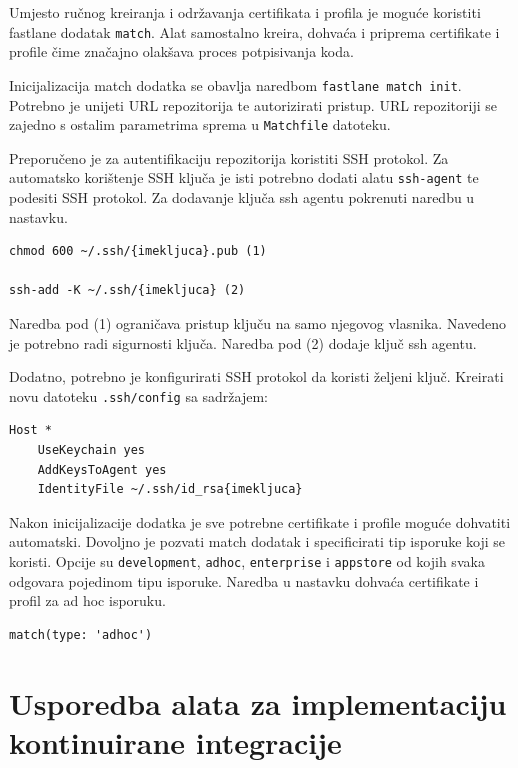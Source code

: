 \documentclass[times, utf8, diplomski, numeric]{fer}
\begin{document}
\begin{appendices}
Umjesto ručnog kreiranja i održavanja certifikata i profila je moguće koristiti fastlane dodatak \verb|match|\citep{fastlane:match}. Alat samostalno kreira, dohvaća i priprema certifikate i profile čime značajno olakšava proces potpisivanja koda.

Inicijalizacija match dodatka se obavlja naredbom \verb|fastlane match init|. Potrebno je unijeti URL repozitorija te autorizirati pristup. URL repozitoriji se zajedno s ostalim parametrima sprema u \verb|Matchfile| datoteku.

Preporučeno je za autentifikaciju repozitorija koristiti SSH protokol. Za automatsko korištenje SSH ključa je isti potrebno dodati alatu \verb|ssh-agent| te podesiti SSH protokol. Za dodavanje ključa ssh agentu pokrenuti naredbu u nastavku.

\begin{verbatim}
chmod 600 ~/.ssh/{imekljuca}.pub (1)

ssh-add -K ~/.ssh/{imekljuca} (2)
\end{verbatim}

Naredba pod (1) ograničava pristup ključu na samo njegovog vlasnika. Navedeno je potrebno radi sigurnosti ključa. Naredba pod (2) dodaje ključ ssh agentu.

Dodatno, potrebno je konfigurirati SSH protokol da koristi željeni ključ. Kreirati novu datoteku \verb|.ssh/config| sa sadržajem:

\begin{verbatim}
Host *
    UseKeychain yes
    AddKeysToAgent yes
    IdentityFile ~/.ssh/id_rsa{imekljuca}
\end{verbatim}

Nakon inicijalizacije dodatka je sve potrebne certifikate i profile moguće dohvatiti automatski. Dovoljno je pozvati match dodatak i specificirati tip isporuke koji se koristi. Opcije su \verb|development|, \verb|adhoc|, \verb|enterprise| i \verb|appstore| od kojih svaka odgovara pojedinom tipu isporuke. Naredba u nastavku dohvaća certifikate i profil za ad hoc isporuku.

\begin{verbatim}
match(type: 'adhoc')
\end{verbatim}








\chapter{Usporedba alata za implementaciju kontinuirane integracije} \label{UsporedbaCIAlata_DodatakC}

\end{appendices}
\end{document}
